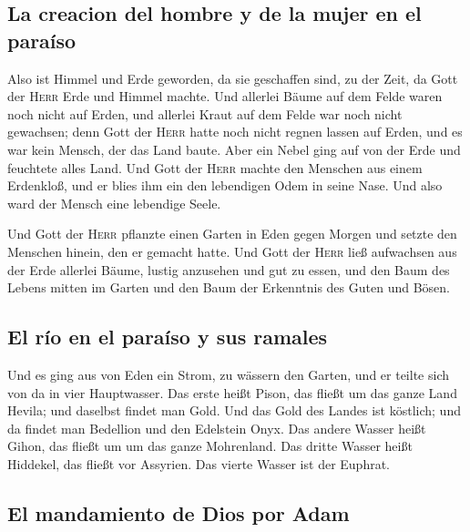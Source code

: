 \hypertarget{la-creacion-del-hombre-y-de-la-mujer-en-el-parauxedso}{%
\subsection{La creacion del hombre y de la mujer en el
paraíso}\label{la-creacion-del-hombre-y-de-la-mujer-en-el-parauxedso}}

 Also ist Himmel und Erde geworden, da sie geschaffen
sind, zu der Zeit, da Gott der \textsc{Herr} Erde und Himmel machte.
 Und allerlei Bäume auf dem Felde waren noch nicht auf
Erden, und allerlei Kraut auf dem Felde war noch nicht gewachsen; denn
Gott der \textsc{Herr} hatte noch nicht regnen lassen auf Erden, und es
war kein Mensch, der das Land baute.  Aber ein Nebel ging
auf von der Erde und feuchtete alles Land.  Und Gott der
\textsc{Herr} machte den Menschen aus einem Erdenkloß, und er blies ihm
ein den lebendigen Odem in seine Nase. Und also ward der Mensch eine
lebendige Seele.

 Und Gott der \textsc{Herr} pflanzte einen Garten in Eden
gegen Morgen und setzte den Menschen hinein, den er gemacht hatte.
 Und Gott der \textsc{Herr} ließ aufwachsen aus der Erde
allerlei Bäume, lustig anzusehen und gut zu essen, und den Baum des
Lebens mitten im Garten und den Baum der Erkenntnis des Guten und Bösen.

\hypertarget{el-ruxedo-en-el-parauxedso-y-sus-ramales}{%
\subsection{El río en el paraíso y sus
ramales}\label{el-ruxedo-en-el-parauxedso-y-sus-ramales}}

 Und es ging aus von Eden ein Strom, zu wässern den
Garten, und er teilte sich von da in vier Hauptwasser. 
Das erste heißt Pison, das fließt um das ganze Land Hevila; und daselbst
findet man Gold.  Und das Gold des Landes ist köstlich;
und da findet man Bedellion und den Edelstein Onyx.  Das
andere Wasser heißt Gihon, das fließt um um das ganze Mohrenland.
 Das dritte Wasser heißt Hiddekel, das fließt vor
Assyrien. Das vierte Wasser ist der Euphrat.

\hypertarget{el-mandamiento-de-dios-por-adam}{%
\subsection{El mandamiento de Dios por
Adam}\label{el-mandamiento-de-dios-por-adam}}

